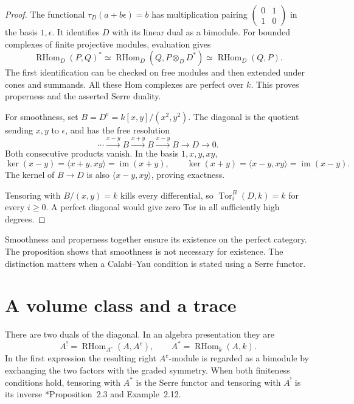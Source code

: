\begin{proof}
The functional $\tau_D(a+b\epsilon)=b$ has multiplication pairing
$\left(\begin{smallmatrix}0&1\\1&0\end{smallmatrix}\right)$ in the basis
$1,\epsilon$. It identifies $D$ with its linear dual as a bimodule.
For bounded complexes of finite projective modules, evaluation gives
\[
 \operatorname{RHom}_D(P,Q)^*
   \simeq\operatorname{RHom}_D(Q,P\otimes_D D^*)
   \simeq\operatorname{RHom}_D(Q,P).
\]
The first identification can be checked on free modules and then extended
under cones and summands. All these Hom complexes are perfect over $k$.
This proves properness and the asserted Serre duality.

For smoothness, set $B=D^e=k[x,y]/(x^2,y^2)$. The diagonal is the
quotient sending $x,y$ to $\epsilon$, and has the free resolution
\begin{equation}\label{cygeom:eq:periodic}
 \cdots\xrightarrow{x-y}B\xrightarrow{x+y}B
 \xrightarrow{x-y}B\longrightarrow D\longrightarrow0.
\end{equation}
Both consecutive products vanish. In the basis $1,x,y,xy$,
\[
 \ker(x-y)=\langle x+y,xy\rangle=\operatorname{im}(x+y),\qquad
 \ker(x+y)=\langle x-y,xy\rangle=\operatorname{im}(x-y).
\]
The kernel of $B\to D$ is also $\langle x-y,xy\rangle$, proving
exactness.

Tensoring with $B/(x,y)=k$ kills every differential, so
$\operatorname{Tor}^B_i(D,k)=k$ for every $i\geq0$.
A perfect diagonal would give zero Tor in all sufficiently high degrees.
\end{proof}

Smoothness and properness together ensure its existence on the perfect
category. The proposition shows that smoothness is not necessary for
existence. The distinction matters when a Calabi--Yau condition is stated
using a Serre functor.

\section{A volume class and a trace}
\label{cygeom:sec:structures}

There are two duals of the diagonal. In an algebra presentation they are
\[
 A^!=\operatorname{RHom}_{A^e}(A,A^e),\qquad
 A^*=\operatorname{RHom}_k(A,k).
\]
In the first expression the resulting right $A^e$-module is regarded as
a bimodule by exchanging the two factors with the graded symmetry.
When both finiteness conditions hold, tensoring with $A^*$ is the Serre functor and
tensoring with $A^!$ is its inverse
\cite{cygeom:BD-relative}*{Proposition~2.3 and Example~2.12}.

